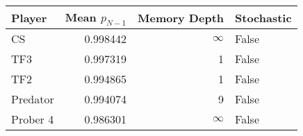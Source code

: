 \begin{tabular}{lrrl}
\toprule
   Player &  Mean $p_{N-1}$ &  Memory Depth & Stochastic \\
\midrule
       CS &        0.998442 &            \(\infty\) &      False \\
      TF3 &        0.997319 &             1 &      False \\
      TF2 &        0.994865 &             1 &      False \\
 Predator &        0.994074 &             9 &      False \\
 Prober 4 &        0.986301 &            \(\infty\) &      False \\
\bottomrule
\end{tabular}
